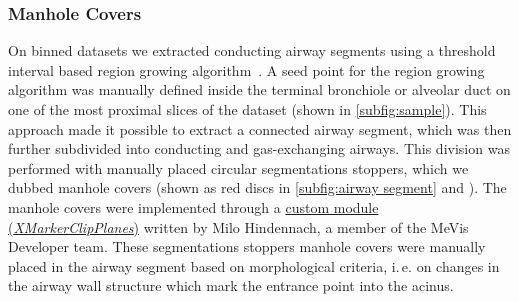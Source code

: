 \documentclass[%
	paper=a4,%
	abstract=true,%
	]{scrartcl}
\newcommand{\ie}{i.\,e.\xspace}
\begin{document}
\subsubsection{Manhole Covers\label{sec:manholecovers}}
On binned datasets we extracted conducting airway segments using a threshold interval based region growing algorithm~\cite{Zucker1976}. A seed point for the region growing algorithm was manually defined inside the terminal bronchiole or alveolar duct on one of the most proximal slices of the dataset (shown in \autoref{subfig:sample}). This approach made it possible to extract a connected airway segment, which was then further subdivided into conducting and gas-exchanging airways. This division was performed with manually placed circular segmentations stoppers, which we dubbed manhole covers (shown as red discs in \autoref{subfig:airway segment} and ). The manhole covers were implemented through a \href{http://www.mevis-research.de/cgi-bin/discus/board-auth.cgi?lm=1282233250&file=/839/11760.html}{custom module (\emph{XMarkerClipPlanes})} written by Milo Hindennach, a member of the MeVis Developer team. These segmentations stoppers manhole covers were manually placed in the airway segment based on morphological criteria, \ie on changes in the airway wall structure which mark the entrance point into the acinus.
\end{document}
